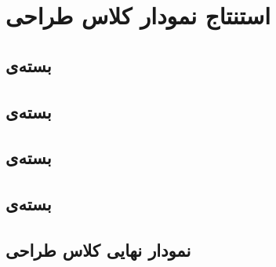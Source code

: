 \chapter{استنتاج نمودار کلاس طراحی}
\section{بسته‌ی \frontend}
\section{بسته‌ی }
\section{بسته‌ی }
\section{بسته‌ی }
\section{نمودار نهایی کلاس طراحی}

